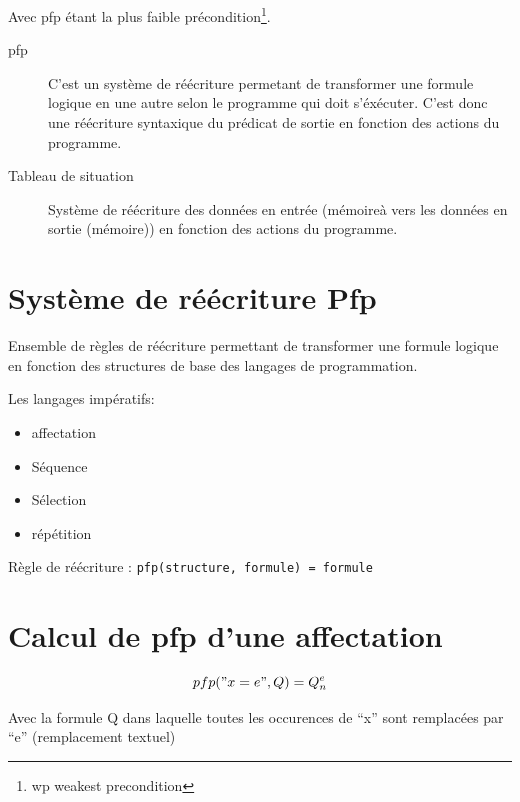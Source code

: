 \documentclass[12pt,a4paper,openany]{book}
\begin{document}
	Avec pfp étant la plus faible précondition\footnote{wp weakest precondition}.
	\begin{description}
		\item[pfp]	C'est un système de réécriture permetant de transformer une formule logique en une autre selon le programme qui doit s'éxécuter.
			C'est donc une réécriture syntaxique du prédicat de sortie en fonction des actions du programme.  \item[Tableau de situation] Système de réécriture des données en entrée (mémoireà vers les données en sortie (mémoire)) en fonction des actions du programme.  \end{description}
	\section{Système de réécriture Pfp}
		Ensemble de règles de réécriture permettant de transformer une formule logique en fonction des structures de base des langages de programmation.

		Les langages impératifs:
			\begin{itemize}
				\item affectation
				\item Séquence
				\item Sélection
				\item répétition
			\end{itemize}

		Règle de réécriture : \texttt{pfp(structure, formule) = formule}

	\section{Calcul de pfp d'une affectation}
	$$pfp("x=e", Q) = Q^e_n$$

	Avec la formule Q dans laquelle toutes les occurences de ``x'' sont remplacées par ``e'' (remplacement textuel)
\end{document}
